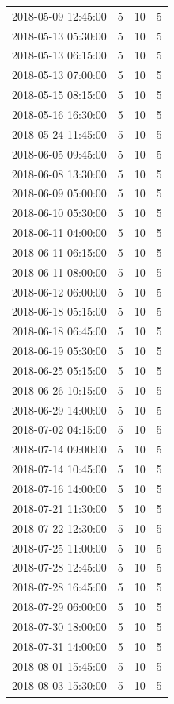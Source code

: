\begin{tabular}{lrrr}
2018-05-09 12:45:00 & 5 & 10 & 5 \\
2018-05-13 05:30:00 & 5 & 10 & 5 \\
2018-05-13 06:15:00 & 5 & 10 & 5 \\
2018-05-13 07:00:00 & 5 & 10 & 5 \\
2018-05-15 08:15:00 & 5 & 10 & 5 \\
2018-05-16 16:30:00 & 5 & 10 & 5 \\
2018-05-24 11:45:00 & 5 & 10 & 5 \\
2018-06-05 09:45:00 & 5 & 10 & 5 \\
2018-06-08 13:30:00 & 5 & 10 & 5 \\
2018-06-09 05:00:00 & 5 & 10 & 5 \\
2018-06-10 05:30:00 & 5 & 10 & 5 \\
2018-06-11 04:00:00 & 5 & 10 & 5 \\
2018-06-11 06:15:00 & 5 & 10 & 5 \\
2018-06-11 08:00:00 & 5 & 10 & 5 \\
2018-06-12 06:00:00 & 5 & 10 & 5 \\
2018-06-18 05:15:00 & 5 & 10 & 5 \\
2018-06-18 06:45:00 & 5 & 10 & 5 \\
2018-06-19 05:30:00 & 5 & 10 & 5 \\
2018-06-25 05:15:00 & 5 & 10 & 5 \\
2018-06-26 10:15:00 & 5 & 10 & 5 \\
2018-06-29 14:00:00 & 5 & 10 & 5 \\
2018-07-02 04:15:00 & 5 & 10 & 5 \\
2018-07-14 09:00:00 & 5 & 10 & 5 \\
2018-07-14 10:45:00 & 5 & 10 & 5 \\
2018-07-16 14:00:00 & 5 & 10 & 5 \\
2018-07-21 11:30:00 & 5 & 10 & 5 \\
2018-07-22 12:30:00 & 5 & 10 & 5 \\
2018-07-25 11:00:00 & 5 & 10 & 5 \\
2018-07-28 12:45:00 & 5 & 10 & 5 \\
2018-07-28 16:45:00 & 5 & 10 & 5 \\
2018-07-29 06:00:00 & 5 & 10 & 5 \\
2018-07-30 18:00:00 & 5 & 10 & 5 \\
2018-07-31 14:00:00 & 5 & 10 & 5 \\
2018-08-01 15:45:00 & 5 & 10 & 5 \\
2018-08-03 15:30:00 & 5 & 10 & 5 \\

\end{tabular}
